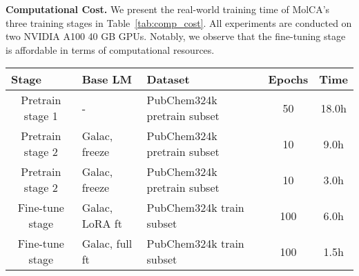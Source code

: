 \documentclass[11pt]{article}
\begin{document}
\textbf{Computational Cost.} We present the real-world training time of MolCA's three training stages in Table~\ref{tab:comp_cost}. All experiments are conducted on two NVIDIA A100 40 GB GPUs. Notably, we observe that the fine-tuning stage is affordable in terms of computational resources. 



\begin{table*}[th!]
\centering
\small
\begin{tabular}{cllcc}\toprule
\multicolumn{1}{l}{Stage} & Base LM                        & Dataset                     & \multicolumn{1}{l}{Epochs} & Time  \\ \midrule
Pretrain stage 1          & -                              & PubChem324k pretrain subset & 50                         & 18.0h \\
Pretrain stage 2          & Galac, freeze  & PubChem324k pretrain subset & 10                         & 9.0h  \\
Pretrain stage 2          & Galac, freeze  & PubChem324k pretrain subset & 10                         & 3.0h  \\
Fine-tune stage           & Galac, LoRA ft & PubChem324k train subset    & 100                        & 6.0h  \\
Fine-tune stage           & Galac, full ft & PubChem324k train subset    & 100                        & 1.5h  \\\bottomrule
\end{tabular}
\caption{Compuational cost for MolCA's three stages.}
\label{tab:comp_cost}
\end{table*} 
\end{document}
